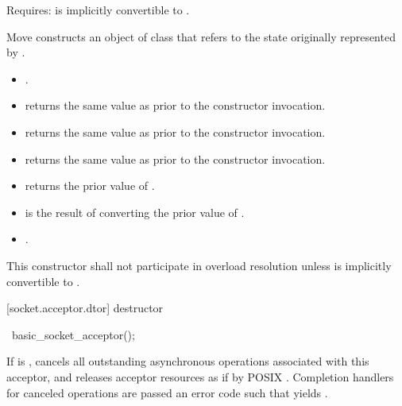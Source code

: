 \begin{itemdescr}
\pnum
Requires:  is implicitly convertible to .

\pnum
\effects Move constructs an object of class  that refers to the state originally represented by .

\pnum
\postconditions 
\begin{itemize}
\item
{}.
\item
{} returns the same value as  prior to the constructor invocation.
\item
{} returns the same value as  prior to the constructor invocation.
\item
{} returns the same value as  prior to the constructor invocation.
\item
{} returns the prior value of .
\item
{} is the result of converting the prior value of .
\item
{}.
\end{itemize}

\pnum
\remarks This constructor shall not participate in overload resolution unless  is implicitly convertible to .
\end{itemdescr}



[socket.acceptor.dtor]{ destructor}

\begin{itemdecl}
~basic_socket_acceptor();
\end{itemdecl}

\begin{itemdescr}
\pnum
\effects If  is , cancels all outstanding asynchronous operations associated with this acceptor, and releases acceptor resources as if by POSIX . Completion handlers for canceled operations are passed an error code  such that  yields .
\end{itemdescr}




